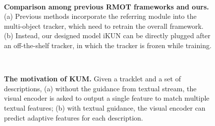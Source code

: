 \documentclass[10pt,twocolumn,letterpaper]{article}
\begin{document}
\begin{figure}
    \centering
    \\
    \caption{
        \textbf{Comparison among previous RMOT frameworks and ours.}
        (a) Previous methods incorporate the referring module into the multi-object tracker,
        which need to retrain the overall framework.
        (b) Instead, our designed model iKUN can be directly plugged after an off-the-shelf tracker,
        in which the tracker is frozen while training.
    }
    \label{fig_1}
\end{figure}

\begin{figure}
    \centering
    \\
    \caption{
        \textbf{The motivation of KUM.}
        Given a tracklet and a set of descriptions,
        (a) without the guidance from textual stream, the visual encoder is asked to output a single feature to match multiple textual features;
        (b) with textual guidance, the visual encoder can predict adaptive features for each description.
    }
    \label{fig_2}
\end{figure}
\end{document}
